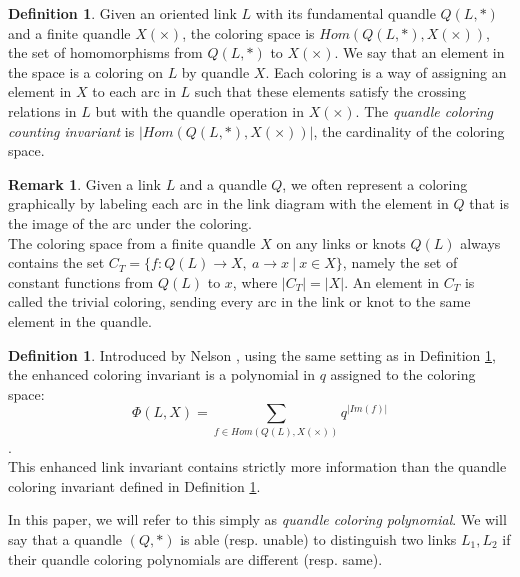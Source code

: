 \documentclass[12pt, letterpaper]{article}
\theoremstyle{plain}
\theoremstyle{definition}
\newtheorem{definition}[theorem]{Definition}
\newtheorem{remark}[theorem]{Remark}
\begin{document}
\begin{definition} \label{countinginva}
     Given an oriented link $L$ with its fundamental quandle $Q(L,*)$ and a finite quandle $X(\times)$, the coloring space is $Hom(Q(L,*),X(\times))$, the set of homomorphisms from $Q(L,*)$ to $X(\times)$. We say that an element in the space is a coloring on $L$ by quandle $X$. Each coloring is a way of assigning an element in $X$ to each arc in $L$ such that these elements satisfy the crossing relations in $L$ but with the quandle operation in $X(\times)$. The \textit{quandle coloring counting invariant} is $|Hom(Q(L,*),X(\times))|$, the cardinality of the coloring space. \\ \end{definition} 
     \begin{remark}
Given a link $L$ and a quandle $Q$, we often represent a coloring graphically by labeling each arc in the link diagram with the element in $Q$ that is the image of the arc under the coloring.
\\The coloring space from a finite quandle $X$ on any links or knots $Q(L)$ always contains the set $C_T=\{f:Q(L)\to X,~a\to x~|~x\in X \}$, namely the set of constant functions from $Q(L)$ to $x$, where $|C_T|=|X|$. An element in $C_T$ is called the trivial coloring, sending every arc in the link or knot to the same element in the quandle. \\

\end{remark}

\begin{definition} \label{colorpolynomial}
    Introduced by Nelson \cite{NN}, using the same setting as in Definition \ref{countinginva}, the enhanced coloring invariant is a polynomial in $q$ assigned to the coloring space: \[\Phi(L,X)=\sum_{f\in Hom(Q(L),X(\times))} q^{|Im(f)|}\]. \\ This enhanced link invariant contains strictly more information than the quandle coloring invariant defined in Definition \ref{countinginva}. \\
    \end{definition}

     In this paper, we will refer to this simply as \textit{quandle coloring polynomial}. We will say that a quandle $(Q,*)$ is able (resp. unable) to distinguish two links $L_1,L_2$ if their quandle coloring polynomials are different (resp. same).\\ 
\end{document}
